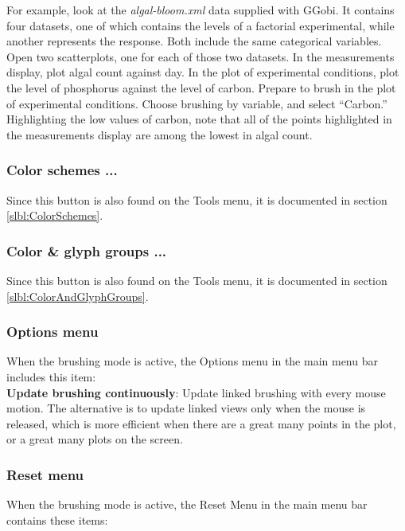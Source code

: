 \documentclass[11pt]{article}
\begin{document}
For example, look at the {\em algal-bloom.xml} data supplied with
GGobi.  It contains four datasets, one of which contains the levels
of a factorial experimental, while another represents the response.
Both include the same categorical variables.  Open two scatterplots,
one for each of those two datasets.  In the measurements display, plot
algal count against day.  In the plot of experimental conditions, plot
the level of phosphorus against the level of carbon.  Prepare to brush
in the plot of experimental conditions.  Choose brushing by variable,
and select ``Carbon.''  Highlighting the low values of carbon, note that
all of the points highlighted in the measurements display are among the
lowest in algal count.

\subsubsection{Color schemes ...}

Since this button is also found on the Tools menu, it is
documented in section \ref{slbl:ColorSchemes}.

\subsubsection{Color \& glyph groups ...}

Since this button is also found on the Tools menu, it is
documented in section \ref{slbl:ColorAndGlyphGroups}.

\subsubsection{Options menu}
%
When the brushing mode is active, the Options menu in the main
menu bar includes this item:
\medskip
\noindent
\\{\bf Update brushing continuously}: Update linked
  brushing with every mouse motion.  The alternative is to update linked
  views only when the mouse is released, which is more efficient when
  there are a great many points in the plot, or a great many plots on
  the screen.

\subsubsection{Reset menu}
%
When the brushing mode is active, the Reset Menu in the main
menu bar contains these items:
\end{document}
